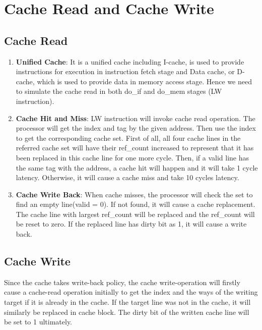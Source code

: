 \documentclass[paper=a4, fontsize=11pt]{scrartcl} %
\numberwithin{equation}{section} %
\numberwithin{figure}{section} %
\numberwithin{table}{section} %
\begin{document}
\section{Cache Read and Cache Write}

\subsection{Cache Read}

\begin{enumerate}
\item \textbf{Unified Cache}: It is a unified cache including I-cache, is used to provide instructions for execution in instruction fetch stage and Data cache, or D-cache, which is used to provide data in memory access stage. Hence we need to simulate the cache read in both do\_if and do\_mem stages (LW instruction).
\item \textbf{Cache Hit and Miss}: LW instruction will invoke cache read operation. The processor will get the index and tag by the given address. Then use the index to get the corresponding cache set. First of all, all four cache lines in the referred cache set will have their ref\_count increased to represent that it has been replaced in this cache line for one more cycle. Then, if a valid line has the same tag with the address, a cache hit will happen and it will take 1 cycle latency. Otherwise, it will cause a cache miss and take 10 cycles latency.
\item \textbf{Cache Write Back}: When cache misses, the processor will check the set to find an empty line(valid = 0). If not found, it will cause a cache replacement. The cache line with largest ref\_count will be replaced and the ref\_count will be reset to zero. If the replaced line has dirty bit as 1, it will cause a write back.
\end{enumerate}

\subsection{Cache Write}
Since the cache takes write-back policy, the cache write-operation will firstly cause a cache-read operation initially to get the index and the ways of the writing target if it is already in the cache. If the target line was not in the cache, it will similarly be replaced in cache block. The dirty bit of the written cache line will be set to 1 ultimately.
\end{document}
